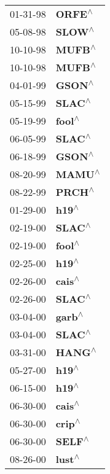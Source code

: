 \begin{supertabular}{p{0.08\textwidth}p{0.2\textwidth}}
 01-31-98 &    \textbf{ORFE\textsuperscript{$\wedge$}} \\
 05-08-98 &    \textbf{SLOW\textsuperscript{$\wedge$}} \\
 10-10-98 &    \textbf{MUFB\textsuperscript{$\wedge$}} \\
 10-10-98 &    \textbf{MUFB\textsuperscript{$\wedge$}} \\
 04-01-99 &    \textbf{GSON\textsuperscript{$\wedge$}} \\
 05-15-99 &    \textbf{SLAC\textsuperscript{$\wedge$}} \\
 05-19-99 &    \textbf{fool\textsuperscript{$\wedge$}} \\
 06-05-99 &    \textbf{SLAC\textsuperscript{$\wedge$}} \\
 06-18-99 &    \textbf{GSON\textsuperscript{$\wedge$}} \\
 08-20-99 &    \textbf{MAMU\textsuperscript{$\wedge$}} \\
 08-22-99 &    \textbf{PRCH\textsuperscript{$\wedge$}} \\
 01-29-00 &     \textbf{h19\textsuperscript{$\wedge$}} \\
 02-19-00 &    \textbf{SLAC\textsuperscript{$\wedge$}} \\
 02-19-00 &    \textbf{fool\textsuperscript{$\wedge$}} \\
 02-25-00 &     \textbf{h19\textsuperscript{$\wedge$}} \\
 02-26-00 &    \textbf{cais\textsuperscript{$\wedge$}} \\
 02-26-00 &    \textbf{SLAC\textsuperscript{$\wedge$}} \\
 03-04-00 &    \textbf{garb\textsuperscript{$\wedge$}} \\
 03-04-00 &    \textbf{SLAC\textsuperscript{$\wedge$}} \\
 03-31-00 &    \textbf{HANG\textsuperscript{$\wedge$}} \\
 05-27-00 &     \textbf{h19\textsuperscript{$\wedge$}} \\
 06-15-00 &     \textbf{h19\textsuperscript{$\wedge$}} \\
 06-30-00 &    \textbf{cais\textsuperscript{$\wedge$}} \\
 06-30-00 &    \textbf{crip\textsuperscript{$\wedge$}} \\
 06-30-00 &    \textbf{SELF\textsuperscript{$\wedge$}} \\
 08-26-00 &    \textbf{lust\textsuperscript{$\wedge$}} \\

\end{supertabular}
